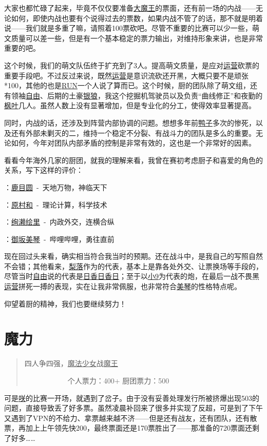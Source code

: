 大家也都忙碌了起来，毕竟不仅仅要准备\uline{大魔王}的票面，还有前一场的内战——无论如何，即使内战也要有个说得过去的票数，如果内战不管了的话，那不就是明着说——我们就是多重了嘛，请照着100票砍吧。尽管不重要的比赛可以少一些，萌文质量可以差一些，但是有一个基本稳定的票力输出，对维持形象来讲，也是非常重要的吧。

这个时候，我们的萌文队伍终于扩充到了3人。提高萌文质量，是应对\uline{运营}砍票的重要手段吧。不过反过来说，既然\uline{运营}是意识流砍还开黑，大概只要不是顽张*100，其他的也是\uline{RUN}一个人说了算而已。这个时候，厨的团队除了萌文组，还有领袖\uline{自由}、后期的土豪\uline{银狼}，我这个挖掘机驾驶员以及负责“曲线修正”和夜勤的\uline{枫叶}几人。虽然人数上没有显著增加，但是专业化的分工，使得效率显著提高。

同时，内战的话，还涉及到阵营内部协调的问题。想想多年前\uline{鸭子}多次的惨死，以及还有外部未剿灭的二，维持一个稳定不分裂、有战斗力的团队是多么的重要。无论如何，今年对团队内部矛盾的控制是非常有效的，这也是一个非常好的因素。

\newpage

看看今年海外几家的厨团，就我的理解来看，我曾在赛初考虑厨子和喜爱的角色的关系，写下这样的评价：

：\uline{鹿目圆}~-~天地万物，神临天下

：\uline{原村和}~-~理论计算，科学技术

：\uline{绚濑绘里}~-~内政外交，连横合纵

：\uline{御坂美琴}~-~哔哩哔哩，勇往直前

现在回过头来看，确实相当符合我当时的预期。还在战斗中，是我自己的写照自然不会错；其他看来，\uline{梨落}作为的代表，基本上是靠各处外交、让票换场等手段的，尽管当时\uline{自由}说的代表是\uline{日香日香日}；至于以\uline{小9}为代表的炮，在最后一战不畏黑\uline{运营}拼死一搏的表现，实在让我非常佩服，也非常符合\uline{美琴}的性格特点呢。

仰望着厨的精神，我们也要继续努力！

\chapter{魔力}
\begin{quote}
四人争四强，\uline{魔法少女}战\uline{魔王}

　　　　　　个人票力：400+ 厨团票力：500
\end{quote}

可是\uline{咲}的比赛一开场，就遇到了岔子。由于没有妥善处理发行所被挤爆出现503的问题，直接导致丢了好多票。虽然凌晨补回来了很多并实现了反超，可是到了下午又遇到了VPN的不给力、拿票越来越不济——但是还有战友，还有团队，还有散票，再加上上午领先快200，最终票面还是170票胜出了——那准备的720票面还剩了好多……

